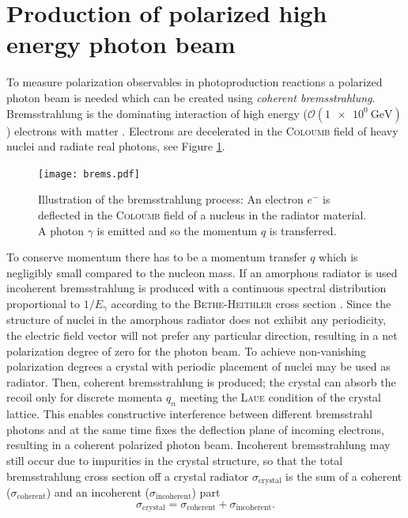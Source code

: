 \section{Production of polarized high energy photon beam}
\label{sec:pol}
To measure polarization observables in photoproduction reactions a polarized photon beam is needed which can be created using \emph{coherent bremsstrahlung}. Bremsstrahlung is the dominating interaction of high energy ($\mathcal{O}\left(\SI{1e0}{\giga\eV}\right)$) electrons with matter \cite{leo}. Electrons are decelerated in the \textsc{Coloumb} field of heavy nuclei and radiate real photons, see Figure \ref{fig:brems}. 

\begin{figure}[htbp]
	\centering
	\texttt{[image: brems.pdf]}
	\caption{Illustration of the bremsstrahlung process: An electron $e^-$ is deflected in the \textsc{Coloumb} field of a nucleus in the radiator material. A photon $\gamma$ is emitted and so the momentum $q$ is transferred.}
	\label{fig:brems}
\end{figure}
\noindent To conserve momentum there has to be a momentum transfer $q$ which is negligibly small compared to the nucleon mass. If an amorphous radiator is used incoherent bremsstrahlung is produced with a continuous spectral distribution proportional to $1/E_\gamma$ according to the \textsc{Bethe-Heithler} cross section \cite{hei}. Since the structure of nuclei in the amorphous radiator does not exhibit any periodicity, the electric field vector will not prefer any particular direction, resulting in a net polarization degree of zero for the photon beam. To achieve non-vanishing polarization degrees a crystal with periodic placement of nuclei may be used as radiator. Then, coherent bremsstrahlung is produced; the crystal can absorb the recoil only for discrete momenta $q_n$ meeting the \textsc{Laue} condition \cite{dem} of the crystal lattice. This enables constructive interference between different bremsstrahl photons and at the same time fixes the deflection plane of incoming electrons, resulting in a coherent polarized photon beam. Incoherent bremsstrahlung may still occur due to impurities in the crystal structure, so that the total bremsstrahlung cross section off a crystal radiator $\sigma_\text{crystal}$ is the sum of a coherent ($\sigma_\text{coherent}$) and an incoherent ($\sigma_\text{incoherent}$) part
\begin{equation}
	\sigma_\text{crystal}=\sigma_\text{coherent}+\sigma_\text{incoherent}.
\end{equation}
